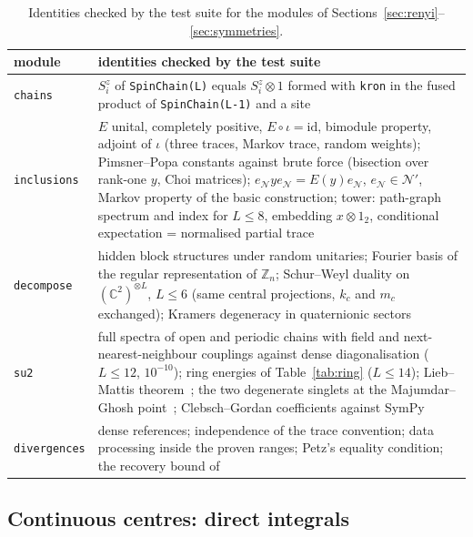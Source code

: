 \documentclass[11pt]{article}
\newcommand{\C}{\mathbb{C}}
\begin{document}
\begin{table}[t]
\centering\footnotesize
\begin{tabular}{>{\raggedright\arraybackslash}p{}>{\raggedright\arraybackslash}p{}}
\toprule
module & identities checked by the test suite\\
\midrule
\texttt{chains} & $S^z_i$ of \texttt{SpinChain(L)} equals $S^z_i\otimes1$ formed with \texttt{kron} in the fused product of
\texttt{SpinChain(L-1)} and a site\\
\texttt{inclusions} & $E$ unital, completely positive, $E\circ\iota=\mathrm{id}$, bimodule property, adjoint of $\iota$ (three
traces, Markov trace, random weights); Pimsner--Popa constants against brute force (bisection over rank-one $y$, Choi
matrices); $e_{\mathcal N}ye_{\mathcal N}=E(y)e_{\mathcal N}$, $e_{\mathcal N}\in\mathcal N'$, Markov property of the
basic construction; tower: path-graph spectrum and index for $L\le8$, embedding $x\otimes1_2$, conditional
expectation = normalised partial trace\\
\texttt{decompose} & hidden block structures under random unitaries; Fourier basis of the regular representation of
$\mathbb Z_n$; Schur--Weyl duality on $(\C^2)^{\otimes L}$, $L\le6$ (same central projections, $k_c$ and $m_c$
exchanged); Kramers degeneracy in quaternionic sectors\\
\texttt{su2} & full spectra of open and periodic chains with field and next-nearest-neighbour couplings against dense
diagonalisation ($L\le12$, $10^{-10}$); ring energies of Table~\ref{tab:ring} ($L\le14$); Lieb--Mattis
theorem~\cite{lieb1962}; the two degenerate singlets at the Majumdar--Ghosh point~\cite{majumdar1969,majumdar1969b};
Clebsch--Gordan coefficients against SymPy\\
\texttt{divergences} & dense references; independence of the trace convention; data processing inside the proven
ranges; Petz's equality condition; the recovery bound of~\cite[Theorem~2.1]{junge2018}\\
\bottomrule
\end{tabular}
\caption{Identities checked by the test suite for the modules of Sections~\ref{sec:renyi}--\ref{sec:symmetries}.}
\label{tab:tests}
\end{table}

\subsection{Continuous centres: direct integrals}\label{sec:dintegral}
\end{document}
